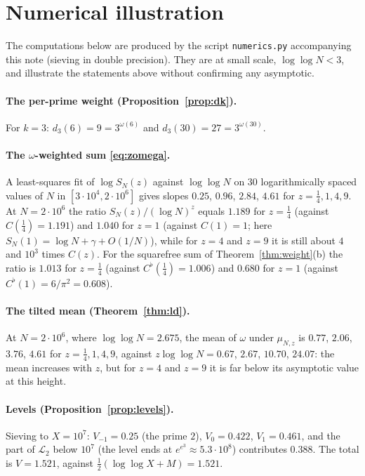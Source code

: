 \documentclass[11pt]{amsart}
\theoremstyle{definition}
\newcommand{\half}{\tfrac12}
\newcommand{\loglog}{\log\log}
\begin{document}
\section{Numerical illustration}\label{sec:numerics}

The computations below are produced by the script \texttt{numerics.py} accompanying this note (sieving in
double precision). They are at small scale, $\loglog N<3$, and illustrate the statements above without
confirming any asymptotic.

\paragraph{The per-prime weight (Proposition~\ref{prop:dk}).} For $k=3$: $d_3(6)=9=3^{\omega(6)}$ and
$d_3(30)=27=3^{\omega(30)}$.

\paragraph{The \texorpdfstring{$\omega$}{omega}-weighted sum \eqref{eq:zomega}.} A least-squares fit of $\log S_N(z)$ against
$\loglog N$ on $30$ logarithmically spaced values of $N$ in $[3\cdot10^4,2\cdot10^6]$ gives slopes
$0.25$, $0.96$, $2.84$, $4.61$ for $z=\tfrac14,1,4,9$. At $N=2\cdot10^6$ the ratio $S_N(z)/(\log N)^z$ equals
$1.189$ for $z=\tfrac14$ (against $C(\tfrac14)=1.191$) and $1.040$ for $z=1$ (against $C(1)=1$; here
$S_N(1)=\log N+\gamma+O(1/N)$), while for $z=4$ and $z=9$ it is still about $4$ and $10^3$ times $C(z)$. For the
squarefree sum of Theorem~\ref{thm:weight}(b) the ratio is $1.013$ for $z=\tfrac14$ (against
$C^\flat(\tfrac14)=1.006$) and $0.680$ for $z=1$ (against $C^\flat(1)=6/\pi^2=0.608$).

\paragraph{The tilted mean (Theorem~\ref{thm:ld}).} At $N=2\cdot10^6$, where $\loglog N=2.675$, the mean of
$\omega$ under $\mu_{N,z}$ is $0.77$, $2.06$, $3.76$, $4.61$ for $z=\tfrac14,1,4,9$, against
$z\loglog N=0.67$, $2.67$, $10.70$, $24.07$: the mean increases with $z$, but for $z=4$ and $z=9$ it is far
below its asymptotic value at this height.

\paragraph{Levels (Proposition~\ref{prop:levels}).} Sieving to $X=10^7$: $V_{-1}=0.25$ (the prime $2$),
$V_0=0.422$, $V_1=0.461$, and the part of $\mathcal L_2$ below $10^7$ (the level ends at
$e^{e^3}\approx5.3\cdot10^8$) contributes $0.388$. The total is $V=1.521$, against
$\half(\loglog X+M)=1.521$.
\end{document}
